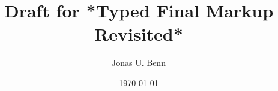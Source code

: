 \documentclass[format=acmsmall, review=true, screen=true, natbib=false]{acmart}
\author{Jonas U. Benn}
\date{\today}
\title{Draft for *Typed Final Markup Revisited*}
\begin{document}




\maketitle

\clearpage
\vspace*{\fill}
\begin{center}
\cite{blankpage}
\end{center}
\vspace*{\fill}
\clearpage



\printbibliography
\end{document}
